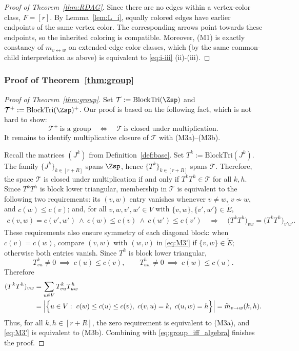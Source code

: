 \documentclass[12pt]{amsart}
\theoremstyle{plain}
\theoremstyle{definition}
\theoremstyle{remark}
\newcommand{\1}{\mathbf{1}}
\newcommand{\tri}{\mathrm{BlockTri}}
\begin{document}
\begin{proof}[Proof of Theorem~\ref{thm:RDAG}]
Since there are no edges within a vertex-color class, $F=[r]$.
By Lemma~\ref{lem:L_i}, equally colored edges have earlier endpoints of the same vertex color.
The corresponding arrows point towards these endpoints,
so the inherited coloring is compatible.
Moreover, (M1) is exactly constancy of $m_{v\leftrightarrow w}$ on extended-edge color classes, which (by the same common-child
interpretation as above) is equivalent to \eqref{eq:i-iii} (ii)-(iii).
\end{proof}


\subsubsection{Proof of Theorem~\ref{thm:group}}


\begin{proof}[Proof of Theorem~\ref{thm:group}]
Set $\mathcal{T}:=\tri(\Zsp)$ and $\mathcal{T}^+:=\tri(\Zsp)^+$. Our proof is based on the following fact, which is not hard to show:
\begin{equation}\label{eq:group_iff_algebra}
\mathcal{T}^+\ \text{is a group}\quad\Longleftrightarrow\quad \mathcal{T}\ \text{is closed under multiplication}.
\end{equation}
It remains to identify multiplicative closure of $\mathcal{T}$ with (M3a)--(M3b).

Recall the matrices $(J^k)$ from Definition~\ref{def:base}. Set $T^{k}:=\tri(J^{k})$. 
The family $\{J^{k}\}_{k\in[r+R]}$ spans $\Zsp$, hence $\{T^{k}\}_{k\in[r+R]}$ spans $\mathcal{T}$. Therefore, the space $\mathcal{T}$ is closed under multiplication if and only if
$T^{k}T^{h}\in\mathcal{T}$ for all $k,h$.
Since $T^kT^h$ is block lower triangular, membership in $\mathcal{T}$ is equivalent to the following two requirements: its $(v,w)$ entry vanishes whenever $v\neq w$, $v\nsim w$, and $c(w)\leq c(v)$; and, for all $v,w,v',w'\in V$ with $\{v,w\},\{v',w'\}\in\tilde E$,
\begin{align}\label{eq:M3'}
c(v,w)=c(v',w')\ \land\ c(w)\leq c(v)\ \land\ c(w')\leq c(v')
\quad\Longrightarrow\quad
\bigl(T^{k}T^{h}\bigr)_{vw}=\bigl(T^{k}T^{h}\bigr)_{v'w'}.
\end{align}
These requirements also ensure symmetry of each diagonal block: when $c(v)=c(w)$, compare $(v,w)$ with $(w,v)$ in \eqref{eq:M3'} if $\{v,w\}\in\tilde E$; otherwise both entries vanish.
Since $T^{k}$ is block lower triangular,
\[
T^{k}_{vu}\neq 0 \ \implies\ c(u)\le c(v),
\qquad
T^{h}_{uw}\neq 0 \ \implies\ c(w)\le c(u).
\]
Therefore
\begin{align*}
(T^{k}T^{h})_{vw}
&=\sum_{u\in V} T^{k}_{vu}T^{h}_{uw} \notag\\
&=\Bigl|\Bigl\{u\in V:\ c(w)\le c(u)\le c(v),\ c(v,u)=k,\ c(u,w)=h\Bigr\}\Bigr|
=\widetilde m_{v\to w}(k,h).
\end{align*}
Thus, for all $k,h\in[r+R]$, the zero requirement is equivalent to (M3a), and \eqref{eq:M3'} is equivalent to (M3b). Combining with \eqref{eq:group_iff_algebra} finishes the proof.
\end{proof}
\end{document}
